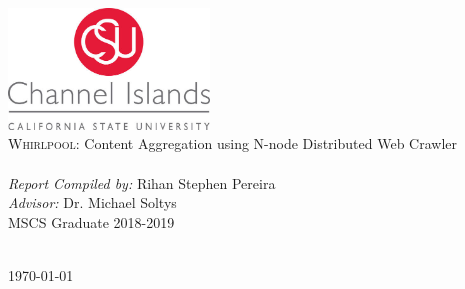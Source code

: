 \begin{titlepage}
\begin{center}
\includegraphics[width=0.40\textwidth]{../media/correctlogo.jpg}~\\[1cm]


{\large {\textsc{Whirlpool:} Content Aggregation using N-node Distributed Web Crawler}}\\[0.5cm]

\HRule \\[0.4cm]
{\textit{Report Compiled by:} {Rihan Stephen Pereira}}\\[0.1cm]
{\textit{Advisor:} {Dr. Michael Soltys}}\\[0.1cm]
{\small {MSCS Graduate 2018-2019}}\\[0.1cm]
\HRule \\[1.5cm]


\vfill

{\large \today}
\end{center}
\end{titlepage}

